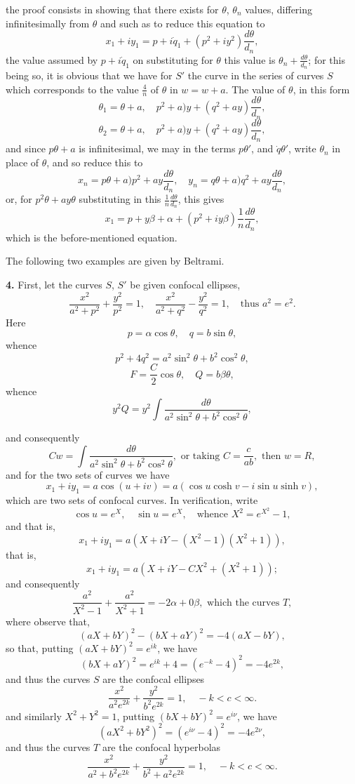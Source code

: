 \documentclass[11pt,a4paper]{article}
\begin{document}
the proof consists in showing that there exists for $\theta$, $\theta_n$ values, differing infinitesimally from $\theta$ and such as to reduce this equation to
\[
x_1 + i y_1 = p + i \dot q_1 + (p^2 + iy^2) \frac{d\theta}{d_n},
\]
the value assumed by $p + i\dot q_1$ on substituting for $\theta$ this value is $\theta_n + \frac{d\theta}{d_n}$; for this being so, it is obvious that we have for $S'$ the curve in the series of curves $S$ which corresponds to the value $\frac{4}{n}$ of $\theta$ in $w = w + a$. The value of $\theta$, in this form
\[
\theta_1 = \theta + a, \quad p^2 + a)y + (q^2 + ay)\frac{d\theta}{d_n},
\]
\[
\theta_2 = \theta + a, \quad p^2 + a)y + (q^2 + ay)\frac{d\theta}{d_n},
\]
and since $p\theta + a$ is infinitesimal, we may in the terms $p\theta'$, and $\dot q\theta'$, write $\theta_n$ in place of $\theta$, and so reduce this to
\[
x_n = p\theta + a)p^2 + ay \frac{d\theta}{d_n}, \quad y_n = q\theta + a)q^2 + a y \frac{d\theta}{d_n},
\]
or, for $p^2 \theta + a y\theta$ substituting in this $\frac{1}{n}\frac{d\theta}{d_n}$, this gives
\[
x_1 = p + y\beta + \alpha + (p^2 + i y\beta) \frac{1}{n} \frac{d\theta}{d_n},
\]
which is the before-mentioned equation.

The following two examples are given by Beltrami.

\textbf{4.} First, let the curves $S$, $S'$ be given confocal ellipses,
\[
\frac{x^2}{a^2 + p^2} + \frac{y^2}{p^2} = 1, \quad \frac{x^2}{a^2 + q^2} - \frac{y^2}{q^2} = 1, \quad \text{thus } a^2 = e^2.
\]
Here
\[
p = \alpha \cos \theta, \quad q = b \sin \theta,
\]
whence
\[
p^2 + 4q^2 = a^2 \sin^2 \theta + b^2 \cos^2 \theta,
\]
\[
F = \frac{C}{2} \cos \theta, \quad Q = b\beta\theta,
\]
whence
\[
y^2 Q = y^2 \int \frac{d \theta}{a^2 \sin^2 \theta + b^2 \cos^2 \theta},
\]

and consequently
\[
Cw = \int \frac{d\theta}{a^2 \sin^2 \theta + b^2 \cos^2 \theta}, \text{ or taking } C = \frac{c}{ab}, \text{ then } w = R,
\]
and for the two sets of curves we have
\[
x_1 + iy_1 = a \cos(u + iv) = a(\cos u \cosh v - i \sin u \sinh v),
\]
which are two sets of confocal curves. In verification, write
\[
\cos u = e^{X}, \quad \sin u = e^{X}, \quad \text{whence } X^2 = e^{X^2} - 1,
\]
and that is,
\[
x_1 + iy_1 = a (X + i Y - (X^2 - 1)(X^2 + 1)),
\]
that is,
\[
x_1 + iy_1 = a(X + iY - C X^2 + (X^2 + 1));
\]
and consequently
\[
\frac{a^2}{X^2 - 1} + \frac{a^2}{X^2 + 1} = -2 \alpha + 0\beta, \text{ which the curves } T,
\]
where observe that,
\[
(a X + b Y)^2 - (b X + a Y)^2 = - 4 (a X - b Y),
\]
so that, putting $(a X + b Y)^2 = e^{i k}$, we have
\[
(b X + a Y)^2 = e^{i k} + 4 = (e^{- k} - 4)^2 = - 4 e^{2k},
\]
and thus the curves $S$ are the confocal ellipses
\[
\frac{x^2}{a^2 e^{2k}} + \frac{y^2}{b^2 e^{2k}} = 1, \quad - k < c < \infty.
\]
and similarly $X^2 + Y^2 = 1$, putting $(b X + b Y)^2 = e^{i \nu}$, we have
\[
(a X^2 + b Y^2)^2 = (e^{i \nu} - 4)^2 = - 4 e^{2\nu},
\]
and thus the curves $T$ are the confocal hyperbolas
\[
\frac{x^2}{a^2 + b^2 e^{2k}} + \frac{y^2}{b^2 + a^2 e^{2k}} = 1, \quad -k < c < \infty.
\]
\end{document}
